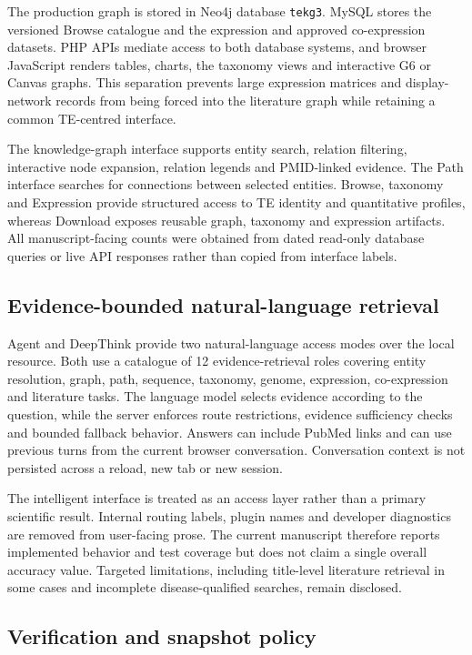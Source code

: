 The production graph is stored in Neo4j database \texttt{tekg3}. MySQL stores the versioned Browse catalogue and the expression and approved co-expression datasets. PHP APIs mediate access to both database systems, and browser JavaScript renders tables, charts, the taxonomy views and interactive G6 or Canvas graphs. This separation prevents large expression matrices and display-network records from being forced into the literature graph while retaining a common TE-centred interface.

The knowledge-graph interface supports entity search, relation filtering, interactive node expansion, relation legends and PMID-linked evidence. The Path interface searches for connections between selected entities. Browse, taxonomy and Expression provide structured access to TE identity and quantitative profiles, whereas Download exposes reusable graph, taxonomy and expression artifacts. All manuscript-facing counts were obtained from dated read-only database queries or live API responses rather than copied from interface labels.

\subsection{Evidence-bounded natural-language retrieval}

Agent and DeepThink provide two natural-language access modes over the local resource. Both use a catalogue of 12 evidence-retrieval roles covering entity resolution, graph, path, sequence, taxonomy, genome, expression, co-expression and literature tasks. The language model selects evidence according to the question, while the server enforces route restrictions, evidence sufficiency checks and bounded fallback behavior. Answers can include PubMed links and can use previous turns from the current browser conversation. Conversation context is not persisted across a reload, new tab or new session.

The intelligent interface is treated as an access layer rather than a primary scientific result. Internal routing labels, plugin names and developer diagnostics are removed from user-facing prose. The current manuscript therefore reports implemented behavior and test coverage but does not claim a single overall accuracy value. Targeted limitations, including title-level literature retrieval in some cases and incomplete disease-qualified searches, remain disclosed.

\subsection{Verification and snapshot policy}


